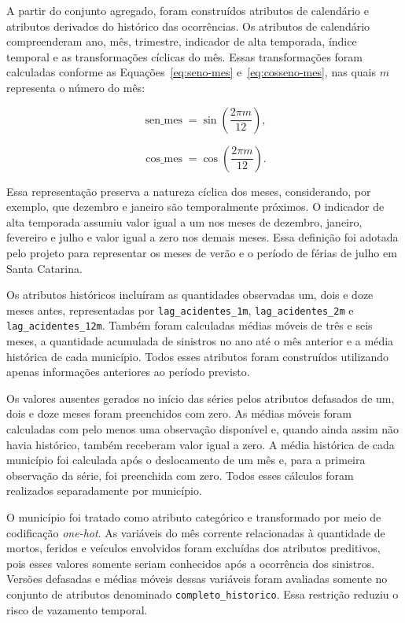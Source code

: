 \documentclass[12pt]{article}
\begin{document}
A partir do conjunto agregado, foram construídos atributos de calendário e atributos derivados do histórico das ocorrências. Os atributos de calendário compreenderam ano, mês, trimestre, indicador de alta temporada, índice temporal e as transformações cíclicas do mês. Essas transformações foram calculadas conforme as Equações~\ref{eq:seno-mes} e~\ref{eq:cosseno-mes}, nas quais $m$ representa o número do mês:

\begin{equation}
    \operatorname{sen\_mes} =
    \sin\left(\frac{2\pi m}{12}\right),
    \label{eq:seno-mes}
\end{equation}

\begin{equation}
    \operatorname{cos\_mes} =
    \cos\left(\frac{2\pi m}{12}\right).
    \label{eq:cosseno-mes}
\end{equation}

Essa representação preserva a natureza cíclica dos meses, considerando, por exemplo, que dezembro e janeiro são temporalmente próximos. O indicador de alta temporada assumiu valor igual a um nos meses de dezembro, janeiro, fevereiro e julho e valor igual a zero nos demais meses. Essa definição foi adotada pelo projeto para representar os meses de verão e o período de férias de julho em Santa Catarina.

Os atributos históricos incluíram as quantidades observadas um, dois e doze meses antes, representadas por \texttt{lag\_acidentes\_1m}, \texttt{lag\_acidentes\_2m} e \texttt{lag\_acidentes\_12m}. Também foram calculadas médias móveis de três e seis meses, a quantidade acumulada de sinistros no ano até o mês anterior e a média histórica de cada município. Todos esses atributos foram construídos utilizando apenas informações anteriores ao período previsto.

Os valores ausentes gerados no início das séries pelos atributos defasados de um, dois e doze meses foram preenchidos com zero. As médias móveis foram calculadas com pelo menos uma observação disponível e, quando ainda assim não havia histórico, também receberam valor igual a zero. A média histórica de cada município foi calculada após o deslocamento de um mês e, para a primeira observação da série, foi preenchida com zero. Todos esses cálculos foram realizados separadamente por município.

O município foi tratado como atributo categórico e transformado por meio de codificação \textit{one-hot}. As variáveis do mês corrente relacionadas à quantidade de mortos, feridos e veículos envolvidos foram excluídas dos atributos preditivos, pois esses valores somente seriam conhecidos após a ocorrência dos sinistros. Versões defasadas e médias móveis dessas variáveis foram avaliadas somente no conjunto de atributos denominado \texttt{completo\_historico}. Essa restrição reduziu o risco de vazamento temporal.
\end{document}
